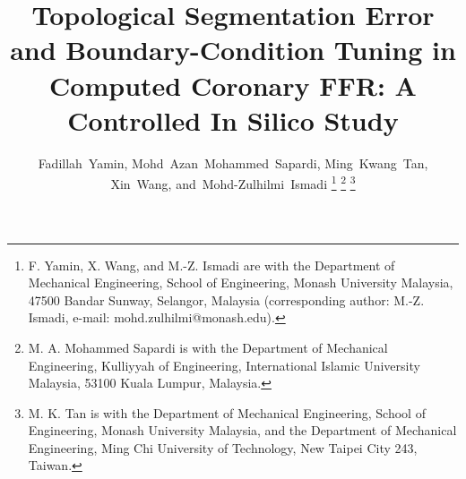 \documentclass[journal,twoside,web]{ieeecolor}
\begin{document}

\title{Topological Segmentation Error and Boundary-Condition Tuning in Computed Coronary FFR: A Controlled In
Silico Study}

\author{Fadillah~Yamin,
        Mohd~Azan~Mohammed~Sapardi,
        Ming~Kwang~Tan,
        Xin~Wang,
        and~\mbox{Mohd-Zulhilmi~Ismadi}\endgraf\vspace{-\baselineskip}%
\thanks{F. Yamin, X. Wang, and M.-Z. Ismadi are with the Department of Mechanical Engineering, School of
Engineering, Monash University Malaysia, 47500 Bandar Sunway, Selangor, Malaysia (corresponding author:
M.-Z. Ismadi, e-mail: mohd.zulhilmi@monash.edu).}%
\thanks{M. A. Mohammed Sapardi is with the Department of Mechanical Engineering, Kulliyyah of Engineering,
International Islamic University Malaysia, 53100 Kuala Lumpur, Malaysia.}%
\thanks{M. K. Tan is with the Department of Mechanical Engineering, School of Engineering, Monash University
Malaysia, and the Department of Mechanical Engineering, Ming Chi University of Technology, New Taipei City 243,
Taiwan.}}


\maketitle
\end{document}
